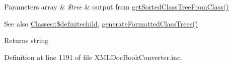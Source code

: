 \begin{DoxyParams}[1]{\-Parameters}
array & {\em \$tree} & output from \hyperlink{class_converter_a4608c8dbec49cd82b6a11951b2704ae5}{get\-Sorted\-Class\-Tree\-From\-Class()} \\
\hline
\end{DoxyParams}
\begin{DoxySeeAlso}{\-See also}
\hyperlink{class_classes_a3bfcd7033b3a72a42d39b10adf37c69b}{\-Classes\-::\$definitechild}, \hyperlink{class_x_m_l_doc_book_converter_ac4ce6d55dd5c5683966b882dcc6809e0}{generate\-Formatted\-Class\-Trees()} 
\end{DoxySeeAlso}
\begin{DoxyReturn}{\-Returns}
string 
\end{DoxyReturn}


\-Definition at line 1191 of file \-X\-M\-L\-Doc\-Book\-Converter.\-inc.


